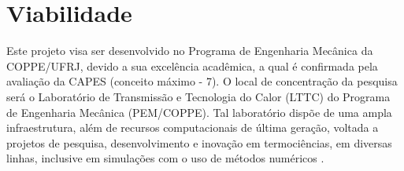 \section{Viabilidade}

Este projeto visa ser desenvolvido no Programa de Engenharia Mecânica da COPPE/UFRJ,
devido a sua excelência acadêmica, a qual é confirmada pela avaliação da CAPES (conceito máximo - 7).
O local de concentração da pesquisa será o Laboratório de Transmissão e Tecnologia do Calor (LTTC) do Programa de Engenharia Mecânica (PEM/COPPE). 
Tal laboratório dispõe de uma ampla infraestrutura, 
além de recursos computacionais de última geração, 
voltada a projetos de pesquisa, desenvolvimento e inovação
em termociências, em diversas linhas, 
inclusive em simulações com o uso de métodos numéricos \cite{lttccoppe}. 

